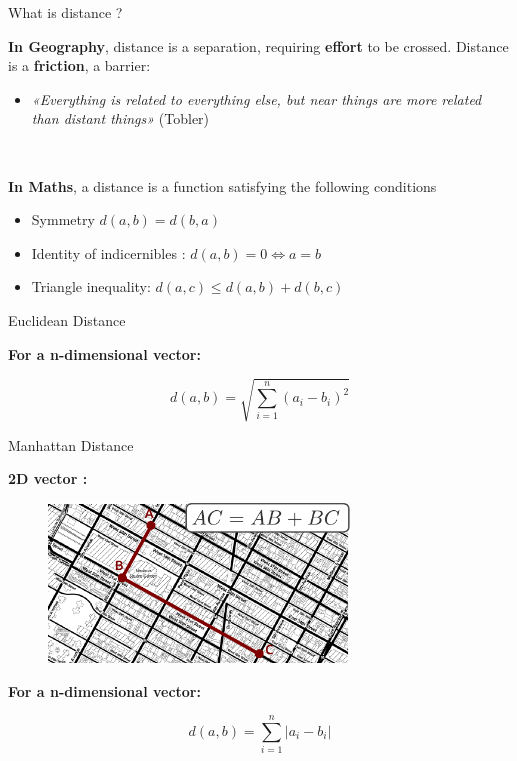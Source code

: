 \begin{frame}{What is distance ?}


\textbf{In Geography}, distance is a separation, requiring \textbf{effort} to be crossed. Distance is a \textbf{friction}, a barrier:

\begin{itemize}
  \item \emph{«Everything is related to everything else, but near things are more related than distant things»} (Tobler)
\end{itemize}

~ 

\textbf{In Maths}, a distance is a function satisfying the following conditions 

\begin{itemize}
  \item Symmetry $d(a, b) = d(b,a)$
  \item Identity of indicernibles : $d(a, b) = 0 \Longleftrightarrow a = b$
  \item Triangle inequality: $d(a,c) \leq d(a,b) + d(b,c)$
\end{itemize}

\end{frame}


\begin{frame}{Euclidean Distance }


\textbf{For a n-dimensional vector:}

\begin{equation}
  \nonumber
  d(a,b) = \sqrt{\sum_{i=1}^n (a_i - b_i)^2}
\end{equation}

\end{frame}


\begin{frame}{Manhattan Distance}

\textbf{2D vector : }

\begin{figure}
  \includegraphics[width=8cm]{DistancesMan.pdf}
\end{figure}

\textbf{For a n-dimensional vector:}

\begin{equation}
  \nonumber
  d(a,b) = \sum_{i=1}^n |a_i - b_i|
\end{equation}

\end{frame}







